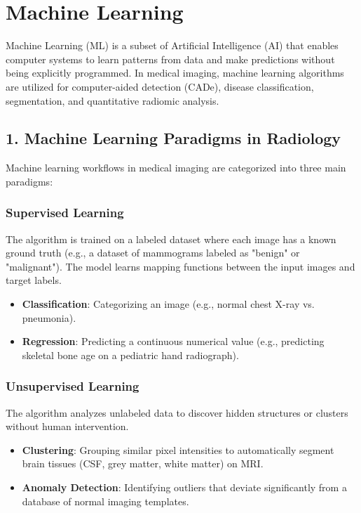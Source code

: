 \chapter{Machine Learning}

\label{ch:machine_learning}

Machine Learning (ML) is a subset of Artificial Intelligence (AI) that enables computer systems to learn patterns from data and make predictions without being explicitly programmed. In medical imaging, machine learning algorithms are utilized for computer-aided detection (CADe), disease classification, segmentation, and quantitative radiomic analysis.


\section*{1. Machine Learning Paradigms in Radiology}
Machine learning workflows in medical imaging are categorized into three main paradigms:

\subsection*{Supervised Learning}
The algorithm is trained on a labeled dataset where each image has a known ground truth (e.g., a dataset of mammograms labeled as "benign" or "malignant"). The model learns mapping functions between the input images and target labels.
\begin{itemize}
    \item \textbf{Classification}: Categorizing an image (e.g., normal chest X-ray vs. pneumonia).
    \item \textbf{Regression}: Predicting a continuous numerical value (e.g., predicting skeletal bone age on a pediatric hand radiograph).
\end{itemize}

\subsection*{Unsupervised Learning}
The algorithm analyzes unlabeled data to discover hidden structures or clusters without human intervention.
\begin{itemize}
    \item \textbf{Clustering}: Grouping similar pixel intensities to automatically segment brain tissues (CSF, grey matter, white matter) on MRI.
    \item \textbf{Anomaly Detection}: Identifying outliers that deviate significantly from a database of normal imaging templates.
\end{itemize}

